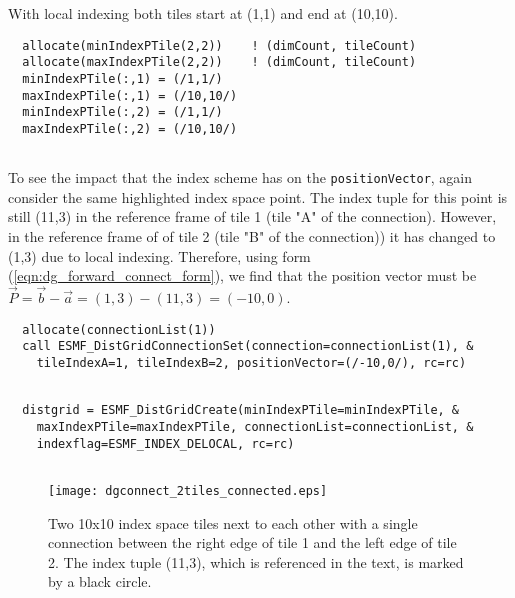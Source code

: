    With local indexing both tiles start at (1,1) and end at (10,10). 

 \begin{verbatim}
  allocate(minIndexPTile(2,2))    ! (dimCount, tileCount)
  allocate(maxIndexPTile(2,2))    ! (dimCount, tileCount)
  minIndexPTile(:,1) = (/1,1/)
  maxIndexPTile(:,1) = (/10,10/)
  minIndexPTile(:,2) = (/1,1/)
  maxIndexPTile(:,2) = (/10,10/)
 
\end{verbatim}
 

   To see the impact that the index scheme has on the {\tt positionVector},
   again consider the same highlighted index space point. The index tuple
   for this point is still (11,3) in the reference frame of tile 1 (tile "A" of
   the connection). However, in the reference frame of of tile 2 
   (tile "B" of the connection)) it has changed to (1,3) due to local indexing.
   Therefore, using form (\ref{eqn:dg_forward_connect_form}), we find that the
   position vector must be $\vec P = \vec b - \vec a = (1,3) - (11,3) = (-10,0)$. 

 \begin{verbatim}
  allocate(connectionList(1))
  call ESMF_DistGridConnectionSet(connection=connectionList(1), &
    tileIndexA=1, tileIndexB=2, positionVector=(/-10,0/), rc=rc)
 
\end{verbatim}
 

 \begin{verbatim}
  distgrid = ESMF_DistGridCreate(minIndexPTile=minIndexPTile, &
    maxIndexPTile=maxIndexPTile, connectionList=connectionList, &
    indexflag=ESMF_INDEX_DELOCAL, rc=rc)
 
\end{verbatim}
 

  
   \begin{figure}[h]
     \caption{Two 10x10 index space tiles next to each other with a single
       connection between the right edge of tile 1 and the left edge of tile 2.
       The index tuple (11,3), which is referenced in
       the text, is marked by a black circle.}
     \centering
     \texttt{[image: dgconnect\_2tiles\_connected.eps]}
     \label{fig:dgconnect_2tiles_connected}
   \end{figure}
  
